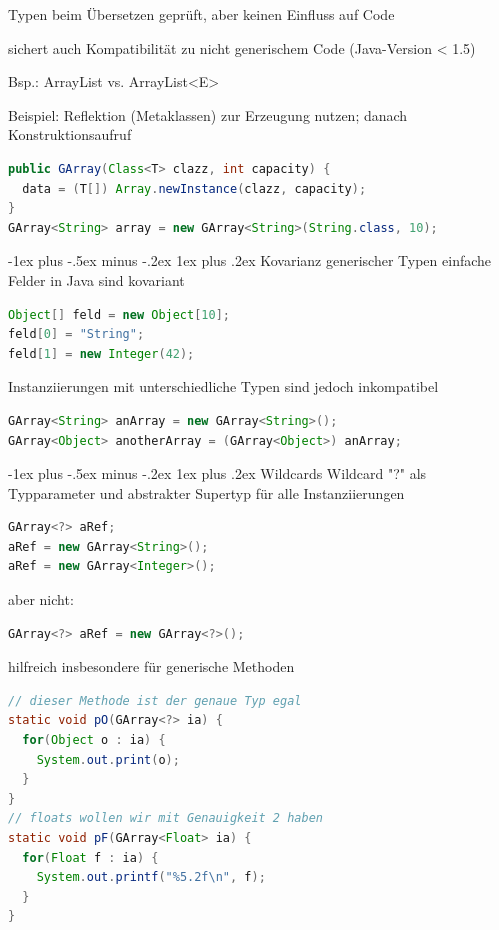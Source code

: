 \documentclass[10pt]{article}
\makeatletter
\renewcommand{\subsubsection}{\@startsection{subsubsection}{3}{0mm}%
                                {-1ex plus -.5ex minus -.2ex}%
                                {1ex plus .2ex}%
                                {\normalfont\small\bfseries}}
\makeatother
\begin{document}
Typen beim Übersetzen geprüft, aber keinen Einfluss auf Code

sichert auch Kompatibilität zu nicht generischem Code (Java-Version < 1.5) 

Bsp.: ArrayList vs. ArrayList<E>

Beispiel: Reflektion (Metaklassen) zur Erzeugung nutzen; danach Konstruktionsaufruf
\begin{lstlisting}[language=java]
public GArray(Class<T> clazz, int capacity) {
  data = (T[]) Array.newInstance(clazz, capacity);
}
GArray<String> array = new GArray<String>(String.class, 10);
\end{lstlisting}

\subsubsection{Kovarianz generischer Typen}
einfache Felder in Java sind kovariant
\begin{lstlisting}[language=java]
Object[] feld = new Object[10];
feld[0] = "String";
feld[1] = new Integer(42);
\end{lstlisting}

Instanziierungen mit unterschiedliche Typen sind jedoch inkompatibel
\begin{lstlisting}[language=java]
GArray<String> anArray = new GArray<String>();
GArray<Object> anotherArray = (GArray<Object>) anArray;
\end{lstlisting}

\subsubsection{Wildcards}
Wildcard "?" als Typparameter und abstrakter Supertyp für alle Instanziierungen
\begin{lstlisting}[language=java]
GArray<?> aRef;
aRef = new GArray<String>();
aRef = new GArray<Integer>();
\end{lstlisting}
aber nicht:
\begin{lstlisting}[language=java]
GArray<?> aRef = new GArray<?>();
\end{lstlisting}

hilfreich insbesondere für generische Methoden
\begin{lstlisting}[language=java]
// dieser Methode ist der genaue Typ egal
static void pO(GArray<?> ia) {
  for(Object o : ia) {
    System.out.print(o);
  }
}
// floats wollen wir mit Genauigkeit 2 haben
static void pF(GArray<Float> ia) {
  for(Float f : ia) {
    System.out.printf("%5.2f\n", f);
  }
}
\end{lstlisting}
\end{document}
